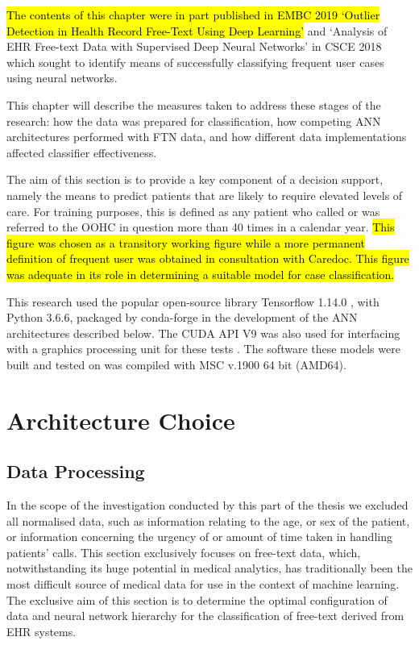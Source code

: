 \hl{The contents of this chapter were in part published in EMBC 2019 `Outlier Detection in Health Record Free-Text Using Deep Learning'} \cite{wallace2019outlier} and `Analysis of EHR Free-text Data with Supervised Deep Neural Networks' \cite{wallace2018analysis} in CSCE 2018 which sought to identify means of successfully classifying frequent user cases using neural networks.

This chapter will describe the measures taken to address these stages of the research: how the data was prepared for classification, how competing ANN architectures performed with FTN data, and how different data implementations affected classifier effectiveness. 

The aim of this section is to provide a key component of a decision support, namely the means to predict patients that are likely to require elevated levels of care. For training purposes, this is defined as any patient who called or was referred to the OOHC in question more than 40 times in a calendar year. \hl{This figure was chosen as a transitory working figure while a more permanent definition of frequent user was obtained in consultation with Caredoc. This figure was adequate in its role in determining a suitable model for case classification.}  

This research used the popular open-source library Tensorflow 1.14.0 \cite{tensorflow2015-whitepaper}, with Python 3.6.6, packaged by conda-forge in the development of the ANN architectures described below. The CUDA API V9 was also used for interfacing with a graphics processing unit for these tests \cite{nvidia2017cuda}. The software these models were built and tested on was compiled with MSC v.1900 64 bit (AMD64).



\section{Architecture Choice}
\label{M}

\subsection{Data Processing}
\label{DP}


In the scope of the investigation conducted by this part of the thesis we excluded all normalised data, such as information relating to the age, or sex of the patient, or information concerning the urgency of or amount of time taken in handling patients' calls. This section exclusively focuses on free-text data, which, notwithstanding  its huge potential in medical analytics, has traditionally been the most difficult source of medical data for use in the context of machine learning. The exclusive aim of this section is to determine the optimal configuration of data and neural network hierarchy for the classification of free-text derived from EHR systems.  

